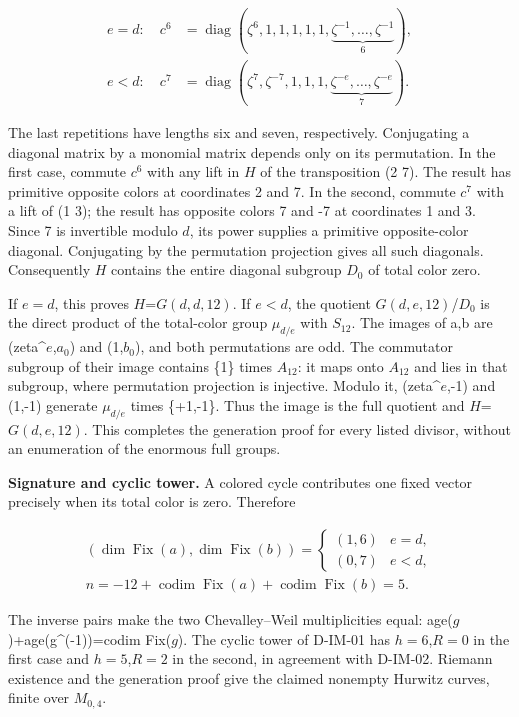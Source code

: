 \[
\begin{aligned}e=d:\quad c^6&=\operatorname{diag}(\zeta^6,1,1,1,1,1,\underbrace{\zeta^{-1},\ldots,\zeta^{-1}}_{6}),\\e<d:\quad c^7&=\operatorname{diag}(\zeta^7,\zeta^{-7},1,1,1,\underbrace{\zeta^{-e},\ldots,\zeta^{-e}}_{7}).\end{aligned}
\]

The last repetitions have lengths six and seven, respectively. Conjugating a diagonal matrix by a monomial matrix depends only on its permutation. In the first case, commute \(c^6\) with any lift in \(H\) of the transposition (2 7). The result has primitive opposite colors at coordinates 2 and 7. In the second, commute \(c^7\) with a lift of (1 3); the result has opposite colors 7 and -7 at coordinates 1 and 3. Since 7 is invertible modulo \(d\), its power supplies a primitive opposite-color diagonal. Conjugating by the permutation projection gives all such diagonals. Consequently \(H\) contains the entire diagonal subgroup \(D_0\) of total color zero.

If \(e= d\), this proves \(H\)=\(G(d,d,12)\). If \(e< d\), the quotient \(G(d,e,12)\)/\(D_0\) is the direct product of the total-color group \(\mu_{d/e}\) with \(S_{12}\). The images of a,b are (zeta\textasciicircum{}\(e\),\(a_0\)) and (1,\(b_0\)), and both permutations are odd. The commutator subgroup of their image contains \{1\} times \(A_{12}\): it maps onto \(A_{12}\) and lies in that subgroup, where permutation projection is injective. Modulo it, (zeta\textasciicircum{}\(e\),-1) and (1,-1) generate \(\mu_{d/e}\) times \{+1,-1\}. Thus the image is the full quotient and \(H\)=\(G(d,e,12)\). This completes the generation proof for every listed divisor, without an enumeration of the enormous full groups.

\textbf{Signature and cyclic tower.} A colored cycle contributes one fixed vector precisely when its total color is zero. Therefore

\[
\begin{gathered}(\dim\operatorname{Fix}(a),\dim\operatorname{Fix}(b))=\begin{cases}(1,6)&e=d,\\(0,7)&e<d,\end{cases}\\n=-12+\operatorname{codim}\operatorname{Fix}(a)+\operatorname{codim}\operatorname{Fix}(b)=5.\end{gathered}
\]

The inverse pairs make the two Chevalley--Weil multiplicities equal: age(\(g\))+age(g\textasciicircum{}(-1))=codim Fix(\(g\)). The cyclic tower of D-IM-01 has \(h= 6\),\(R= 0\) in the first case and \(h= 5\),\(R= 2\) in the second, in agreement with D-IM-02. Riemann existence and the generation proof give the claimed nonempty Hurwitz curves, finite over \(M_{0,4}\).


